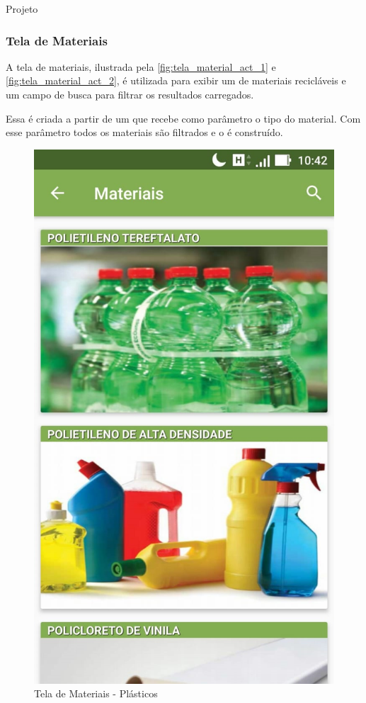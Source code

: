 \documentclass[
	12pt,				%
	openany,			%
	twoside,			%
	a4paper,			%
	english,			%
	french,				%
	spanish,			%
	brazil				%
	]{abntex2}
\begin{document}
\begin{chapter}{Projeto}
\newpage
\subsubsection{Tela de Materiais} \label{ActivityMaterial}
A tela de materiais, ilustrada pela \autoref{fig:tela_material_act_1} e \autoref{fig:tela_material_act_2}, é utilizada para exibir um  de materiais recicláveis e um campo de busca para filtrar os resultados carregados.

Essa  é criada a partir de um  que recebe como parâmetro o tipo do material. Com esse parâmetro todos os materiais são filtrados e o  é construído.

    \begin{figure}[htb]    
 \centering
  \begin{minipage}{0.45\textwidth}
    \centering
    \caption{Tela de Materiais -  Plásticos}
    \includegraphics[scale=0.35]{media/tela_material_act_1.jpg}

\end{minipage}
\end{figure}
\end{chapter}
\end{document}
